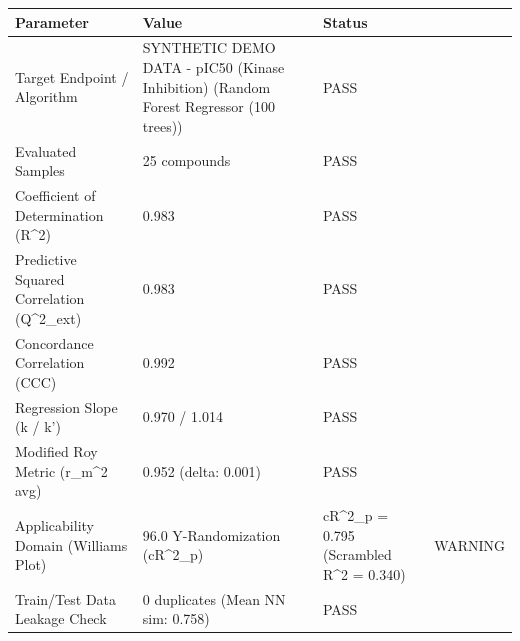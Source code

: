 \begin{tabular}{lll}
\toprule
Parameter & Value & Status \\
\midrule
Target Endpoint / Algorithm & SYNTHETIC DEMO DATA - pIC50 (Kinase Inhibition) (Random Forest Regressor (100 trees)) & PASS \\
Evaluated Samples & 25 compounds & PASS \\
Coefficient of Determination (R^2) & 0.983 & PASS \\
Predictive Squared Correlation (Q^2_ext) & 0.983 & PASS \\
Concordance Correlation (CCC) & 0.992 & PASS \\
Regression Slope (k / k') & 0.970 / 1.014 & PASS \\
Modified Roy Metric (r_m^2 avg) & 0.952 (delta: 0.001) & PASS \\
Applicability Domain (Williams Plot) & 96.0%
Y-Randomization (cR^2_p) & cR^2_p = 0.795 (Scrambled R^2 = 0.340) & WARNING \\
Train/Test Data Leakage Check & 0 duplicates (Mean NN sim: 0.758) & PASS \\
\bottomrule
\end{tabular}
